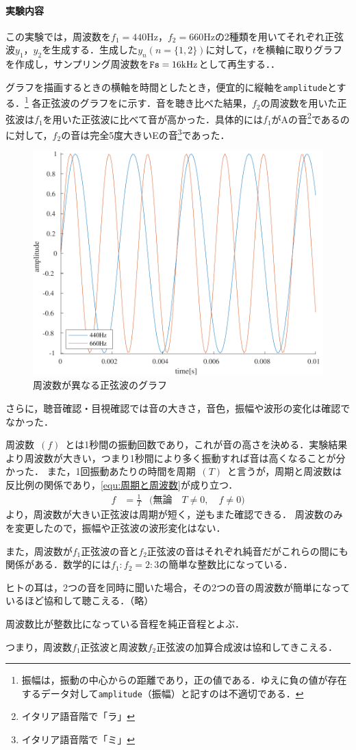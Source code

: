 \paragraph{実験内容}この実験では，周波数を\(f_1=440\textrm{Hz}\)，\(f_2=660\textrm{Hz}\)の2種類を用いてそれぞれ正弦波\(y_1\)，\(y_2\)を生成する．生成した\(y_n(n=\{1,2\})\)に対して，\(t\)を横軸に取りグラフを作成し，サンプリング周波数を\(\textrm{\texttt{Fs}}=16\textrm{kHz}\)として再生する．\scall{}．\par
グラフを描画するときの横軸を時間としたとき，便宜的に縦軸を\texttt{amplitude}とする．\footnote{振幅は，振動の中心からの距離であり，正の値である．ゆえに負の値が存在するデータ対して\texttt{amplitude}（振幅）と記すのは不適切である．}
\result
各正弦波のグラフをに示す．音を聴き比べた結果，\(f_2\)の周波数を用いた正弦波は\(f_1\)を用いた正弦波に比べて音が高かった．具体的には\(f_1\)がAの音\footnote{イタリア語音階で「ラ」}であるのに対して，\(f_2\)の音は完全5度大きいEの音\footnote{イタリア語音階で「ミ」}であった．
\begin{figure}
    \includegraphics[keepaspectratio,width=.3\textwidth]{../../Figures/01_01.pdf}
    \caption{周波数が異なる正弦波のグラフ}
    \label{fig:\kadaiaa}
\end{figure}
さらに，聴音確認・目視確認では音の大きさ，音色，振幅や波形の変化は確認でなかった．\par
\consideration 周波数\ \((f)\)\ とは1秒間の振動回数であり，これが音の高さを決める．実験結果より周波数が大きい，つまり1秒間により多く振動すれば音は高くなることが分かった．
また，1回振動あたりの時間を周期\ \((T)\)\ と言うが，周期と周波数は反比例の関係であり，\eqref{equ:周期と周波数}が成り立つ．
\begin{align}
    f & =\frac{1}{T} & \big(\textrm{無論}\quad T\neq 0,\quad f\neq 0\big)\label{equ:周期と周波数}
\end{align}
より，周波数が大きい正弦波は周期が短く，逆もまた確認できる．
周波数のみを変更したので，振幅や正弦波の波形変化はない．\par
また，周波数が\(f_1\)正弦波の音と\(f_2\)正弦波の音はそれぞれ純音だがこれらの間にも関係がある．数学的には\(f_1:f_2=2:3\)の簡単な整数比になっている．
\begin{leftbar}
    ヒトの耳は，2つの音を同時に聞いた場合，その2つの音の周波数が簡単になっているほど協和して聴こえる．（略）\par
    周波数比が整数比になっている音程を純正音程とよぶ．\hfill{\cite[p.46\ -\ p.47]{音響工学理論基礎}}
\end{leftbar}
つまり，周波数\(f_1\)正弦波と周波数\(f_2\)正弦波の加算合成波は協和してきこえる．
